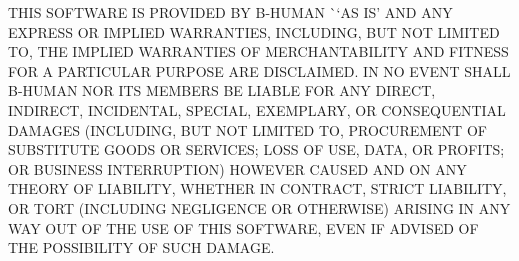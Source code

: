 THIS SOFTWARE IS PROVIDED BY B-\/\+HUMAN \`{}`AS IS'\textquotesingle{} AND ANY EXPRESS OR IMPLIED WARRANTIES, INCLUDING, BUT NOT LIMITED TO, THE IMPLIED WARRANTIES OF MERCHANTABILITY AND FITNESS FOR A PARTICULAR PURPOSE ARE DISCLAIMED. IN NO EVENT SHALL B-\/\+HUMAN NOR ITS MEMBERS BE LIABLE FOR ANY DIRECT, INDIRECT, INCIDENTAL, SPECIAL, EXEMPLARY, OR CONSEQUENTIAL DAMAGES (INCLUDING, BUT NOT LIMITED TO, PROCUREMENT OF SUBSTITUTE GOODS OR SERVICES; LOSS OF USE, DATA, OR PROFITS; OR BUSINESS INTERRUPTION) HOWEVER CAUSED AND ON ANY THEORY OF LIABILITY, WHETHER IN CONTRACT, STRICT LIABILITY, OR TORT (INCLUDING NEGLIGENCE OR OTHERWISE) ARISING IN ANY WAY OUT OF THE USE OF THIS SOFTWARE, EVEN IF ADVISED OF THE POSSIBILITY OF SUCH DAMAGE. 
